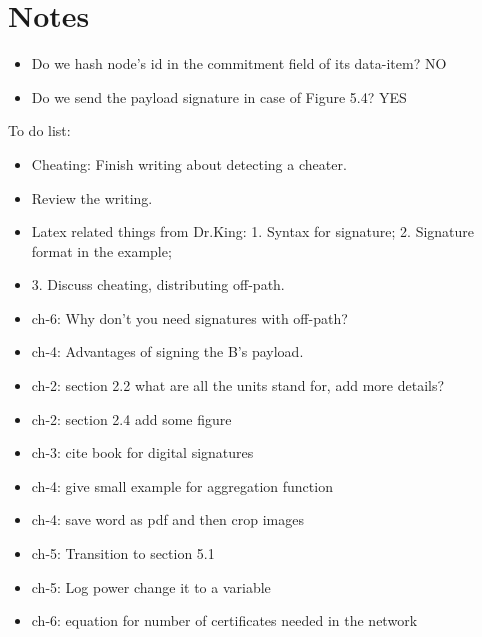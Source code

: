 \chapter{Notes}

\begin{itemize}
	\item Do we hash node's id in the commitment field of its data-item? NO
	\item Do we send the payload signature in case of Figure 5.4? YES
\end{itemize}

To do list:
\begin{itemize}
	\item Cheating: Finish writing about detecting a cheater.
	\item Review the writing.

	\item Latex related things from Dr.King: 1. Syntax for signature; 2. Signature format in the example; 
	\item 3. Discuss cheating, distributing off-path.  
	\item ch-6: Why don't you need signatures with off-path?
	\item ch-4: Advantages of signing the B's payload.

	\item ch-2: section 2.2 what are all the units stand for, add more details?
	\item ch-2: section 2.4 add some figure

	\item ch-3: cite book for digital signatures
	\item ch-4: give small example for aggregation function
	\item ch-4: save word as pdf and then crop images
	\item ch-5: Transition to section 5.1
	\item ch-5: Log power change it to a variable
	\item ch-6: equation for number of certificates needed in the network

\end{itemize}